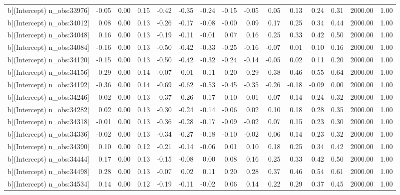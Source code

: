 \begin{table}[ht]
\begin{tabular}{rrrrrrrrrrrrrrr}
  b[(Intercept) n\_obs:33976] & -0.05 & 0.00 & 0.15 & -0.42 & -0.35 & -0.24 & -0.15 & -0.05 & 0.05 & 0.13 & 0.24 & 0.31 & 2000.00 & 1.00 \\ 
  b[(Intercept) n\_obs:34012] & 0.08 & 0.00 & 0.13 & -0.26 & -0.17 & -0.08 & -0.00 & 0.09 & 0.17 & 0.25 & 0.34 & 0.44 & 2000.00 & 1.00 \\ 
  b[(Intercept) n\_obs:34048] & 0.16 & 0.00 & 0.13 & -0.19 & -0.11 & -0.01 & 0.07 & 0.16 & 0.25 & 0.33 & 0.42 & 0.50 & 2000.00 & 1.00 \\ 
  b[(Intercept) n\_obs:34084] & -0.16 & 0.00 & 0.13 & -0.50 & -0.42 & -0.33 & -0.25 & -0.16 & -0.07 & 0.01 & 0.10 & 0.16 & 2000.00 & 1.00 \\ 
  b[(Intercept) n\_obs:34120] & -0.15 & 0.00 & 0.13 & -0.50 & -0.42 & -0.32 & -0.24 & -0.14 & -0.05 & 0.02 & 0.11 & 0.20 & 2000.00 & 1.00 \\ 
  b[(Intercept) n\_obs:34156] & 0.29 & 0.00 & 0.14 & -0.07 & 0.01 & 0.11 & 0.20 & 0.29 & 0.38 & 0.46 & 0.55 & 0.64 & 2000.00 & 1.00 \\ 
  b[(Intercept) n\_obs:34192] & -0.36 & 0.00 & 0.14 & -0.69 & -0.62 & -0.53 & -0.45 & -0.35 & -0.26 & -0.18 & -0.09 & 0.00 & 2000.00 & 1.00 \\ 
  b[(Intercept) n\_obs:34246] & -0.02 & 0.00 & 0.13 & -0.37 & -0.26 & -0.17 & -0.10 & -0.01 & 0.07 & 0.14 & 0.24 & 0.32 & 2000.00 & 1.00 \\ 
  b[(Intercept) n\_obs:34282] & 0.02 & 0.00 & 0.13 & -0.30 & -0.24 & -0.14 & -0.06 & 0.02 & 0.10 & 0.18 & 0.28 & 0.35 & 2000.00 & 1.00 \\ 
  b[(Intercept) n\_obs:34318] & -0.01 & 0.00 & 0.13 & -0.36 & -0.28 & -0.17 & -0.09 & -0.02 & 0.07 & 0.15 & 0.23 & 0.30 & 2000.00 & 1.00 \\ 
  b[(Intercept) n\_obs:34336] & -0.02 & 0.00 & 0.13 & -0.34 & -0.27 & -0.18 & -0.10 & -0.02 & 0.06 & 0.14 & 0.23 & 0.32 & 2000.00 & 1.00 \\ 
  b[(Intercept) n\_obs:34390] & 0.10 & 0.00 & 0.12 & -0.21 & -0.14 & -0.06 & 0.01 & 0.10 & 0.18 & 0.25 & 0.34 & 0.42 & 2000.00 & 1.00 \\ 
  b[(Intercept) n\_obs:34444] & 0.17 & 0.00 & 0.13 & -0.15 & -0.08 & 0.00 & 0.08 & 0.16 & 0.25 & 0.33 & 0.42 & 0.50 & 2000.00 & 1.00 \\ 
  b[(Intercept) n\_obs:34498] & 0.28 & 0.00 & 0.13 & -0.07 & 0.02 & 0.11 & 0.20 & 0.28 & 0.37 & 0.46 & 0.54 & 0.61 & 2000.00 & 1.00 \\ 
  b[(Intercept) n\_obs:34534] & 0.14 & 0.00 & 0.12 & -0.19 & -0.11 & -0.02 & 0.06 & 0.14 & 0.22 & 0.29 & 0.37 & 0.45 & 2000.00 & 1.00 \\ 

\end{tabular}
\end{table}
